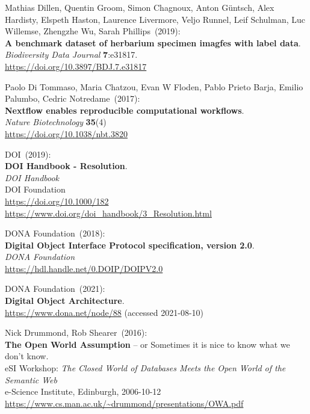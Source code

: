 \begin{thebibliography}{9}
Mathias Dillen, Quentin Groom, Simon Chagnoux, Anton Güntsch, Alex Hardisty, Elspeth Haston, Laurence Livermore, Veljo Runnel, Leif Schulman, Luc Willemse, Zhengzhe Wu, Sarah Phillips~(2019): \\
\textbf{A benchmark dataset of herbarium specimen imagfes with label data}.\\
\emph{Biodiversity Data Journal} \textbf{7}:e31817.\\
\url{https://doi.org/10.3897/BDJ.7.e31817}

Paolo Di Tommaso, Maria Chatzou, Evan W Floden, Pablo Prieto Barja, Emilio Palumbo, Cedric Notredame~(2017): \\
\textbf{Nextflow enables reproducible computational workflows}.\\
\emph{Nature Biotechnology} \textbf{35}(4) \\
\url{https://doi.org/10.1038/nbt.3820}

DOI~(2019): \\
\textbf{{DOI Handbook} - {Resolution}}. \\
\emph{{DOI Handbook}}\\
DOI Foundation\\
\url{https://doi.org/10.1000/182}\\
\url{https://www.doi.org/doi_handbook/3_Resolution.html}

DONA Foundation~(2018): \\
\textbf{Digital Object Interface Protocol specification, version 2.0}.\\
\emph{DONA Foundation}\\
\url{https://hdl.handle.net/0.DOIP/DOIPV2.0}

DONA Foundation~(2021): \\
\textbf{Digital Object Architecture}.\\
\url{https://www.dona.net/node/88} (accessed 2021-08-10)

Nick Drummond, Rob Shearer~(2016): \\
\textbf{The Open World Assumption} -- or Sometimes it is nice to know what we don't know.\\
eSI Workshop: \emph{The Closed World of Databases Meets the Open World of the Semantic Web}\\
e-Science Institute, Edinburgh, 2006-10-12\\
\url{https://www.cs.man.ac.uk/~drummond/presentations/OWA.pdf}


\end{thebibliography}
